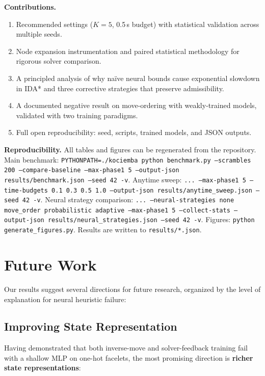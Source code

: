 \documentclass[10pt,twocolumn,a4paper]{article}
\begin{document}
\textbf{Contributions.}
\begin{enumerate}[leftmargin=*]
  \item Recommended settings ($K{=}5$, 0.5\,s budget) with statistical validation across multiple seeds.
  \item Node expansion instrumentation and paired statistical methodology for rigorous solver comparison.
  \item A principled analysis of why na\"ive neural bounds cause exponential slowdown in IDA* and three corrective strategies that preserve admissibility.
  \item A documented negative result on move-ordering with weakly-trained models, validated with two training paradigms.
  \item Full open reproducibility: seed, scripts, trained models, and JSON outputs.
\end{enumerate}

\textbf{Reproducibility.} All tables and figures can be regenerated from the repository. Main benchmark: \texttt{PYTHONPATH=./kociemba python benchmark.py --scrambles 200 --compare-baseline --max-phase1 5 --output-json results/benchmark.json --seed 42 -v}. Anytime sweep: \texttt{... --max-phase1 5 --time-budgets 0.1 0.3 0.5 1.0 --output-json results/anytime\_sweep.json --seed 42 -v}. Neural strategy comparison: \texttt{... --neural-strategies none move\_order probabilistic adaptive --max-phase1 5 --collect-stats --output-json results/neural\_strategies.json --seed 42 -v}. Figures: \texttt{python generate\_figures.py}. Results are written to \texttt{results/*.json}.

\section{Future Work}
\label{sec:future}

Our results suggest several directions for future research, organized by the level of explanation for neural heuristic failure:

\subsection{Improving State Representation}
Having demonstrated that both inverse-move and solver-feedback training fail with a shallow MLP on one-hot facelets, the most promising direction is \textbf{richer state representations}:
\end{document}
